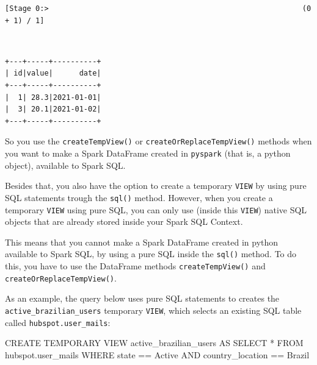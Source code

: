 \documentclass[
  11pt,
  letterpaper,
  DIV=11,
  numbers=noendperiod]{scrreprt}
\newenvironment{Shaded}{\begin{snugshade}}{\end{snugshade}}
\newcommand{\KeywordTok}[1]{\textcolor[rgb]{0.00,0.23,0.31}{#1}}
\newcommand{\NormalTok}[1]{\textcolor[rgb]{0.00,0.23,0.31}{#1}}
\newcommand{\OperatorTok}[1]{\textcolor[rgb]{0.37,0.37,0.37}{#1}}
\newcommand{\StringTok}[1]{\textcolor[rgb]{0.13,0.47,0.30}{#1}}
\begin{document}
\begin{verbatim}
[Stage 0:>                                                          (0 + 1) / 1]
\end{verbatim}

\begin{verbatim}
                                                                                
\end{verbatim}

\begin{verbatim}
+---+-----+----------+
| id|value|      date|
+---+-----+----------+
|  1| 28.3|2021-01-01|
|  3| 20.1|2021-01-02|
+---+-----+----------+
\end{verbatim}

So you use the \texttt{createTempView()} or
\texttt{createOrReplaceTempView()} methods when you want to make a Spark
DataFrame created in \texttt{pyspark} (that is, a python object),
available to Spark SQL.

Besides that, you also have the option to create a temporary
\texttt{VIEW} by using pure SQL statements trough the \texttt{sql()}
method. However, when you create a temporary \texttt{VIEW} using pure
SQL, you can only use (inside this \texttt{VIEW}) native SQL objects
that are already stored inside your Spark SQL Context.

This means that you cannot make a Spark DataFrame created in python
available to Spark SQL, by using a pure SQL inside the \texttt{sql()}
method. To do this, you have to use the DataFrame methods
\texttt{createTempView()} and \texttt{createOrReplaceTempView()}.

As an example, the query below uses pure SQL statements to creates the
\texttt{active\_brazilian\_users} temporary \texttt{VIEW}, which selects
an existing SQL table called \texttt{hubspot.user\_mails}:

\begin{Shaded}
\begin{Highlighting}[]
\KeywordTok{CREATE} \KeywordTok{TEMPORARY} \KeywordTok{VIEW}\NormalTok{ active\_brazilian\_users }\KeywordTok{AS}
\KeywordTok{SELECT} \OperatorTok{*}
\KeywordTok{FROM}\NormalTok{ hubspot.user\_mails}
\KeywordTok{WHERE}\NormalTok{ state }\OperatorTok{==} \StringTok{\textquotesingle{}Active\textquotesingle{}}
\KeywordTok{AND}\NormalTok{ country\_location }\OperatorTok{==} \StringTok{\textquotesingle{}Brazil\textquotesingle{}}
\end{Highlighting}
\end{Shaded}
\end{document}
